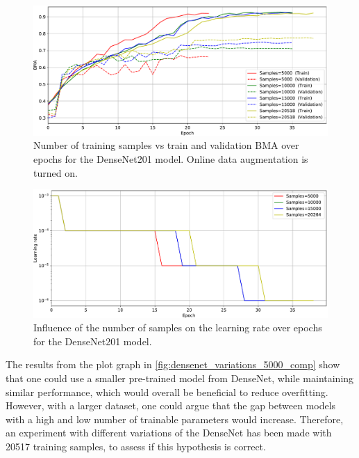     \begin{figure}[ht]
        \centering
        \includegraphics[width=\textwidth]{figs/densenet201_samples_bma_over_epochs.pdf}
        \caption[Number of training samples vs train and validation \ac{BMA} over epochs for the DenseNet201 model.]{Number of training samples vs train and validation \ac{BMA} over epochs for the DenseNet201 model. Online data augmentation is turned on.}
        \label{fig:samples_bma_over_epochs}
    \end{figure}
    \begin{figure}[ht]
        \centering
        \includegraphics[width=\textwidth]{figs/densenet201_samples_lr_over_epochs.pdf}
        \caption{Influence of the number of samples on the learning rate over epochs for the DenseNet201 model.}
        \label{fig:samples_lr_over_epochs}
    \end{figure}
    
    The results from the plot graph in \autoref{fig:densenet_variations_5000_comp} show that one could use a smaller pre-trained model from DenseNet, while maintaining similar performance, which would overall be beneficial to reduce overfitting. However, with a larger dataset, one could argue that the gap between models with a high and low number of trainable parameters would increase. Therefore, an experiment with different variations of the DenseNet has been made with 20517 training samples, to assess if this hypothesis is correct. \par
    
